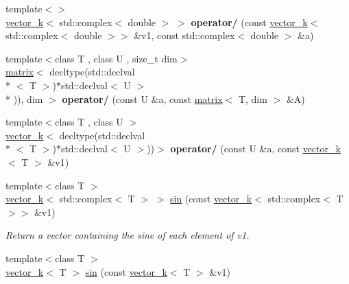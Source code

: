 \begin{DoxyCompactItemize}
\item 
\hypertarget{namespacekeycpp_aef7e4ab9c187ffa93e45ec90e2d1d5d4}{{\footnotesize template$<$$>$ }\\\hyperlink{classkeycpp_1_1vector__k}{vector\-\_\-k}$<$ std\-::complex$<$ double $>$ $>$ {\bfseries operator/} (const \hyperlink{classkeycpp_1_1vector__k}{vector\-\_\-k}$<$ std\-::complex$<$ double $>$$>$ \&v1, const std\-::complex$<$ double $>$ \&a)}\label{namespacekeycpp_aef7e4ab9c187ffa93e45ec90e2d1d5d4}

\item 
\hypertarget{namespacekeycpp_a88f5fa68e3f7fb39690f9e5c93bafc5c}{{\footnotesize template$<$class T , class U , size\-\_\-t dim$>$ }\\\hyperlink{classkeycpp_1_1matrix}{matrix}$<$ decltype(std\-::declval\\*
$<$ T $>$)$\ast$std\-::declval$<$ U $>$\\*
)), dim $>$ {\bfseries operator/} (const U \&a, const \hyperlink{classkeycpp_1_1matrix}{matrix}$<$ T, dim $>$ \&A)}\label{namespacekeycpp_a88f5fa68e3f7fb39690f9e5c93bafc5c}

\item 
\hypertarget{namespacekeycpp_aa5daf45d6627feee18402005fcd83cfd}{{\footnotesize template$<$class T , class U $>$ }\\\hyperlink{classkeycpp_1_1vector__k}{vector\-\_\-k}$<$ decltype(std\-::declval\\*
$<$ T $>$)$\ast$std\-::declval$<$ U $>$))$>$ {\bfseries operator/} (const U \&a, const \hyperlink{classkeycpp_1_1vector__k}{vector\-\_\-k}$<$ T $>$ \&v1)}\label{namespacekeycpp_aa5daf45d6627feee18402005fcd83cfd}

\item 
\hypertarget{namespacekeycpp_a3fad354ed572051e939cc71209c112ab}{{\footnotesize template$<$class T $>$ }\\\hyperlink{classkeycpp_1_1vector__k}{vector\-\_\-k}$<$ std\-::complex$<$ T $>$ $>$ \hyperlink{namespacekeycpp_a3fad354ed572051e939cc71209c112ab}{sin} (const \hyperlink{classkeycpp_1_1vector__k}{vector\-\_\-k}$<$ std\-::complex$<$ T $>$$>$ \&v1)}\label{namespacekeycpp_a3fad354ed572051e939cc71209c112ab}

\begin{DoxyCompactList}\small\item\em Return a vector containing the sine of each element of v1. \end{DoxyCompactList}\item 
\hypertarget{namespacekeycpp_aea600162295a122a2371d75f80f764c5}{{\footnotesize template$<$class T $>$ }\\\hyperlink{classkeycpp_1_1vector__k}{vector\-\_\-k}$<$ T $>$ \hyperlink{namespacekeycpp_aea600162295a122a2371d75f80f764c5}{sin} (const \hyperlink{classkeycpp_1_1vector__k}{vector\-\_\-k}$<$ T $>$ \&v1)}\label{namespacekeycpp_aea600162295a122a2371d75f80f764c5}


\end{DoxyCompactItemize}
